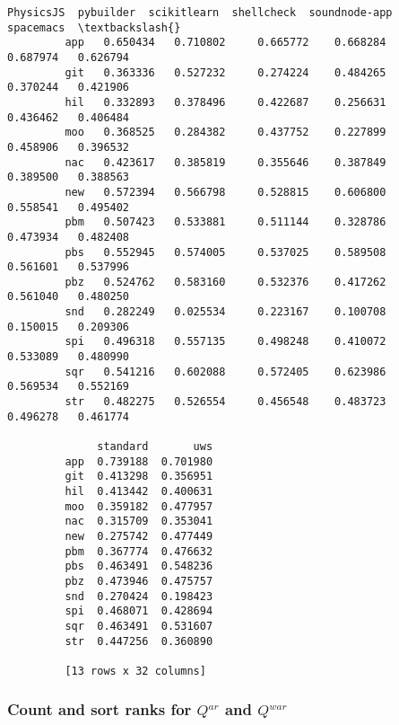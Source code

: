 \documentclass[11pt]{article}
\begin{document}
\begin{Verbatim}[commandchars=\\\{\}]
              PhysicsJS  pybuilder  scikitlearn  shellcheck  soundnode-app  spacemacs  \textbackslash{}
         app   0.650434   0.710802     0.665772    0.668284       0.687974   0.626794   
         git   0.363336   0.527232     0.274224    0.484265       0.370244   0.421906   
         hil   0.332893   0.378496     0.422687    0.256631       0.436462   0.406484   
         moo   0.368525   0.284382     0.437752    0.227899       0.458906   0.396532   
         nac   0.423617   0.385819     0.355646    0.387849       0.389500   0.388563   
         new   0.572394   0.566798     0.528815    0.606800       0.558541   0.495402   
         pbm   0.507423   0.533881     0.511144    0.328786       0.473934   0.482408   
         pbs   0.552945   0.574005     0.537025    0.589508       0.561601   0.537996   
         pbz   0.524762   0.583160     0.532376    0.417262       0.561040   0.480250   
         snd   0.282249   0.025534     0.223167    0.100708       0.150015   0.209306   
         spi   0.496318   0.557135     0.498248    0.410072       0.533089   0.480990   
         sqr   0.541216   0.602088     0.572405    0.623986       0.569534   0.552169   
         str   0.482275   0.526554     0.456548    0.483723       0.496278   0.461774   
         
              standard       uws  
         app  0.739188  0.701980  
         git  0.413298  0.356951  
         hil  0.413442  0.400631  
         moo  0.359182  0.477957  
         nac  0.315709  0.353041  
         new  0.275742  0.477449  
         pbm  0.367774  0.476632  
         pbs  0.463491  0.548236  
         pbz  0.473946  0.475757  
         snd  0.270424  0.198423  
         spi  0.468071  0.428694  
         sqr  0.463491  0.531607  
         str  0.447256  0.360890  
         
         [13 rows x 32 columns]
\end{Verbatim}
            
    \subsubsection{\texorpdfstring{Count and sort ranks for \(Q^{ar}\) and
\(Q^{war}\)}{Count and sort ranks for Q\^{}\{ar\} and Q\^{}\{war\}}}\label{count-and-sort-ranks-for-qar-and-qwar}
\end{document}
